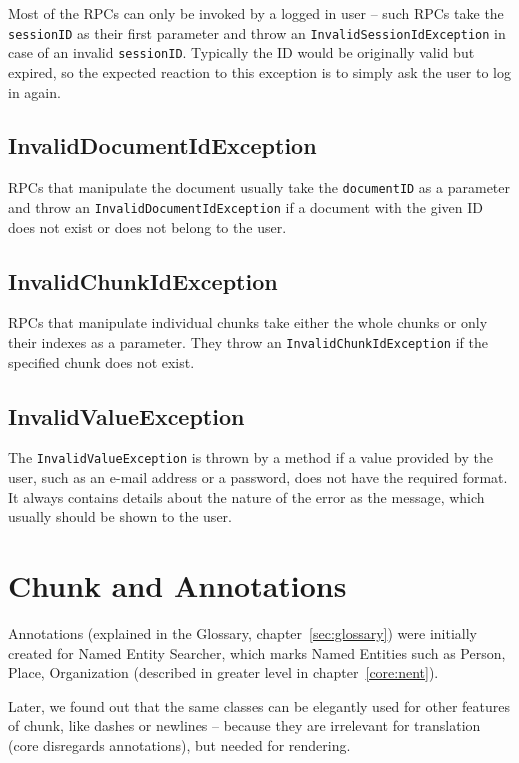 {Most of the RPCs can only be invoked by a logged in user -- such RPCs take the {\tt sessionID} as their first parameter and throw an {\tt InvalidSessionIdException} in case of an invalid {\tt sessionID}. Typically the ID would be originally valid but expired, so the expected reaction to this exception is to simply ask the user to log in again.

\subsection{InvalidDocumentIdException}

RPCs that manipulate the document usually take the {\tt documentID} as a parameter and throw an {\tt InvalidDocumentIdException} if a document with the given ID does not exist or does not belong to the user.

\subsection{InvalidChunkIdException}

RPCs that manipulate individual chunks take either the whole chunks or only their indexes as a parameter. They throw an {\tt InvalidChunkIdException} if the specified chunk does not exist.

\subsection{InvalidValueException}

The {\tt InvalidValueException} is thrown by a method if a value provided by the user, such as an e-mail address or a password, does not have the required format. It always contains details about the nature of the error as the message, which usually should be shown to the user.


\section{Chunk and Annotations}

Annotations (explained in the Glossary, chapter~\ref{sec:glossary}) were 
initially created for Named Entity Searcher, which marks Named Entities such as Person, Place, Organization (described in greater level in chapter~\ref{core:nent}).

Later, we found out that the same classes can be elegantly used for other features of chunk, like dashes or newlines -- because they are irrelevant for translation (core disregards annotations), but needed for rendering.

}
